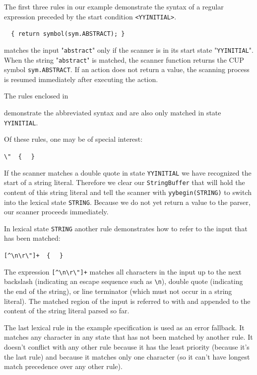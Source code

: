 \documentclass[11pt]{scrartcl}
\newcommand{\bl}{\latex{\symbol{123}}\html{\{}}
\newcommand{\br}{\latex{\symbol{125}}\html{\}}}
\begin{document}
The first three rules in our example demonstrate the syntax of a regular 
expression preceded by the start condition \texttt{<YYINITIAL>}.

{\tt{}\verb+  {+ return symbol(sym.ABSTRACT); \verb+}+}

matches the input "\texttt{abstract}" only if the scanner is in its
start state "\texttt{YYINITIAL}". When the string "\texttt{abstract}" is
matched, the scanner function returns the CUP symbol \texttt{sym.ABSTRACT}.
If an action does not return a value, the scanning process is resumed immediately 
after executing the action.
\label{ExampleRulesBunch}

The rules enclosed in

\texttt{\htmlref{<YYINITIAL> \bl \\
\ \ ...\\
\br}{CodeRulesBunch}}

demonstrate the abbreviated syntax and are also only matched in state \texttt{YYINITIAL}.
\label{ExampleRulesYYbegin}

Of these rules, one may be of special interest:

\verb+\"  { + \texttt{}\verb+ }+

If the scanner matches a double quote in state \texttt{YYINITIAL} we
have recognized the start of a string literal. Therefore we clear our \texttt{StringBuffer}
that will hold the content of this string literal and tell the scanner
with \texttt{yybegin(STRING)} to switch into the lexical state \texttt{STRING}.
Because we do not yet return a value to the parser, our scanner proceeds
immediately.
\label{ExampleRulesYYtext}

In lexical state \texttt{STRING} another
rule demonstrates how to refer to the input that has been matched:

\verb-[^\n\r\"]+  { - \texttt{}\verb+ }+

The expression \verb-[^\n\r\"]+- matches
all characters in the input up to the next backslash (indicating an
escape sequence such as \verb+\n+), double quote (indicating the end
of the string), or line terminator (which must not occur in a string literal).
The matched region of the input is referred to with \texttt{}
and appended to the content of the string literal parsed so far.
\label{ExampleRuleLast}

The last lexical rule in the example specification
is used as an error fallback. It matches any character in any state that
has not been matched by another rule. It doesn't conflict with any other
rule because it has the least priority (because it's the last rule) and
because it matches only one character (so it can't have longest match
precedence over any other rule).
 
\end{document}

